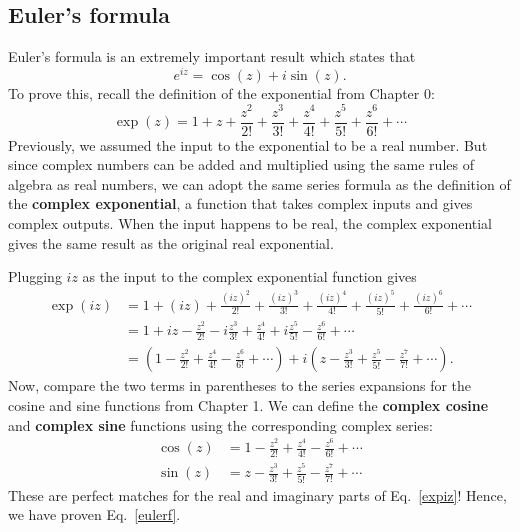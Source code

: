 \documentclass[10pt,a4paper]{article}
\begin{document}
\subsection{Euler's formula}
\label{eulers-formula}

Euler's formula is an extremely important result which states that
\begin{equation}
  e^{iz} = \cos(z) + i \sin(z).
  \label{eulerf}
\end{equation}
To prove this, recall the definition of the exponential from Chapter
0:
\begin{equation}
  \exp(z) = 1 + z + \frac{z^2}{2!} + \frac{z^3}{3!} + \frac{z^4}{4!} + \frac{z^5}{5!} + \frac{z^6}{6!} + \cdots
\end{equation}
Previously, we assumed the input to the exponential to be a real
number.  But since complex numbers can be added and multiplied using
the same rules of algebra as real numbers, we can adopt the same
series formula as the definition of the \textbf{complex exponential},
a function that takes complex inputs and gives complex outputs. When
the input happens to be real, the complex exponential gives the same
result as the original real exponential.

Plugging $iz$ as the input to the complex exponential function gives
\begin{align}
  \exp(iz) &= 1 + (iz) + \frac{(iz)^2}{2!} + \frac{(iz)^3}{3!}
  + \frac{(iz)^4}{4!} + \frac{(iz)^5}{5!} + \frac{(iz)^6}{6!} + \cdots \\
  &= 1 + iz - \frac{z^2}{2!} - i \frac{z^3}{3!} + \frac{z^4}{4!}
  + i \frac{z^5}{5!} - \frac{z^6}{6!} + \cdots \\
  & = \left(1 - \frac{z^2}{2!} + \frac{z^4}{4!} - \frac{z^6}{6!}
  + \cdots\right) + i\left(z  - \frac{z^3}{3!}  + \frac{z^5}{5!}
  - \frac{z^7}{7!} + \cdots\right).
  \label{expiz}
\end{align}
Now, compare the two terms in parentheses to the series expansions for
the cosine and sine functions from Chapter 1. We can define the
\textbf{complex cosine} and \textbf{complex sine} functions using the
corresponding complex series:
\begin{align}
  \cos(z) &= 1 - \frac{z^2}{2!} + \frac{z^4}{4!} - \frac{z^6}{6!} + \cdots \\
  \sin(z) &= z - \frac{z^3}{3!} + \frac{z^5}{5!} - \frac{z^7}{7!} + \cdots
\end{align}
These are perfect matches for the real and imaginary parts of
Eq.~\eqref{expiz}!  Hence, we have proven Eq.~\eqref{eulerf}.
\end{document}
